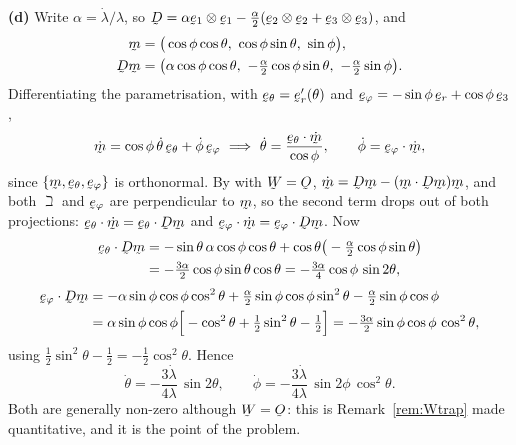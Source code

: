 \begin{solution}
\textbf{(d)} Write $\alpha=\dot\lambda/\lambda$, so
$\bD=\alpha\be_{1}\otimes\be_{1}
-\tfrac\alpha2(\be_{2}\otimes\be_{2}+\be_{3}\otimes\be_{3})$, and
\[
\begin{aligned}
   \bm&=\big(\cos\phi\cos\theta,\ \cos\phi\sin\theta,\ \sin\phi\big),\\
   \bD\bm&=\big(\alpha\cos\phi\cos\theta,\
   -\tfrac\alpha2\cos\phi\sin\theta,\ -\tfrac\alpha2\sin\phi\big).
\end{aligned}
\]
Differentiating the parametrisation, with $\beth=\ber'(\theta)$ and
$\beph=-\sin\phi\,\ber+\cos\phi\,\be_{3}$,
\[
   \dot\bm=\cos\phi\,\dot\theta\,\beth+\dot\phi\,\beph
   \ \Longrightarrow\
   \dot\theta=\frac{\ip{\beth}{\dot\bm}}{\cos\phi},
   \qquad
   \dot\phi=\ip{\beph}{\dot\bm},
\]
since $\{\bm,\beth,\beph\}$ is orthonormal. By  with $\bW=\Ob$,
$\dot\bm=\bD\bm-(\ip\bm{\bD\bm})\bm$, and both $\beth$ and $\beph$ are
perpendicular to $\bm$, so the second term drops out of both projections:
$\ip{\beth}{\dot\bm}=\ip{\beth}{\bD\bm}$ and
$\ip{\beph}{\dot\bm}=\ip{\beph}{\bD\bm}$. Now
\[
\begin{aligned}
   \ip{\beth}{\bD\bm}
   &=-\sin\theta\,\alpha\cos\phi\cos\theta
     +\cos\theta\big(-\tfrac\alpha2\cos\phi\sin\theta\big)\\
   &=-\tfrac{3\alpha}{2}\cos\phi\sin\theta\cos\theta
    =-\tfrac{3\alpha}{4}\cos\phi\,\sin2\theta,
\end{aligned}
\]
\[
\begin{aligned}
   \ip{\beph}{\bD\bm}
   &=-\alpha\sin\phi\cos\phi\cos^{2}\theta
     +\tfrac\alpha2\sin\phi\cos\phi\sin^{2}\theta
     -\tfrac\alpha2\sin\phi\cos\phi\\
   &=\alpha\sin\phi\cos\phi
     \Big[-\cos^{2}\theta+\tfrac12\sin^{2}\theta-\tfrac12\Big]
    =-\tfrac{3\alpha}{2}\sin\phi\cos\phi\,\cos^{2}\theta,
\end{aligned}
\]
using $\tfrac12\sin^{2}\theta-\tfrac12=-\tfrac12\cos^{2}\theta$. Hence
\[
   \boxed{\ \dot\theta=-\frac{3\dot\lambda}{4\lambda}\,\sin2\theta,
   \qquad
   \dot\phi=-\frac{3\dot\lambda}{4\lambda}\,\sin2\phi\,\cos^{2}\theta .\ }
\]
Both are generally non-zero although $\bW=\Ob$: this is
Remark~\ref{rem:Wtrap} made quantitative, and it is the point of the
problem.


\end{solution}
